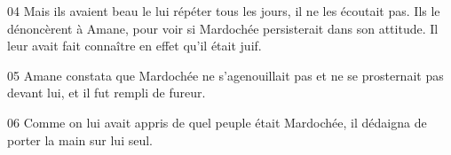 
04 Mais ils avaient beau le lui répéter tous les jours, il ne les écoutait pas. Ils le dénoncèrent à Amane, pour voir si Mardochée persisterait dans son attitude. Il leur avait fait connaître en effet qu’il était juif.

05 Amane constata que Mardochée ne s’agenouillait pas et ne se prosternait pas devant lui, et il fut rempli de fureur.

06 Comme on lui avait appris de quel peuple était Mardochée, il dédaigna de porter la main sur lui seul.